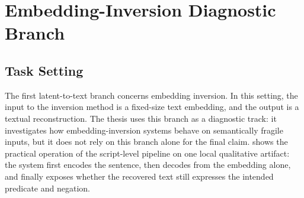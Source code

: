 \section{Embedding-Inversion Diagnostic Branch}
\label{sec:method-embedding-inversion}

\subsection{Task Setting}
\label{subsec:method-embedding-task}

The first latent-to-text branch concerns embedding inversion. In this setting,
the input to the inversion method is a fixed-size text embedding, and the output
is a textual reconstruction. The thesis uses this branch as a diagnostic track:
it investigates how embedding-inversion systems behave on semantically fragile
inputs, but it does not rely on this branch alone for the final claim.
 shows the practical
operation of the script-level pipeline on one local qualitative artifact: the
system first encodes the sentence, then decodes from the embedding alone, and
finally exposes whether the recovered text still expresses the intended
predicate and negation.

